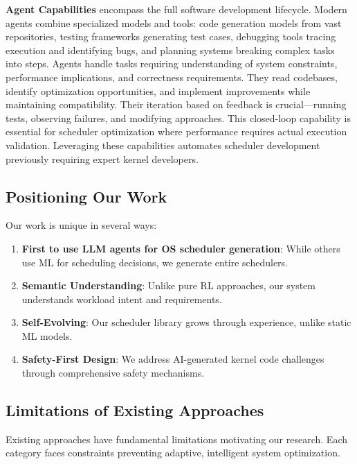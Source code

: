 \textbf{Agent Capabilities} encompass the full software development lifecycle. Modern agents combine specialized models and tools: code generation models from vast repositories, testing frameworks generating test cases, debugging tools tracing execution and identifying bugs, and planning systems breaking complex tasks into steps. Agents handle tasks requiring understanding of system constraints, performance implications, and correctness requirements. They read codebases, identify optimization opportunities, and implement improvements while maintaining compatibility. Their iteration based on feedback is crucial—running tests, observing failures, and modifying approaches. This closed-loop capability is essential for scheduler optimization where performance requires actual execution validation. Leveraging these capabilities automates scheduler development previously requiring expert kernel developers.

\subsection{Positioning Our Work}

Our work is unique in several ways:

\begin{enumerate}
\item \textbf{First to use LLM agents for OS scheduler generation}: While others use ML for scheduling decisions, we generate entire schedulers.

\item \textbf{Semantic Understanding}: Unlike pure RL approaches, our system understands workload intent and requirements.

\item \textbf{Self-Evolving}: Our scheduler library grows through experience, unlike static ML models.

\item \textbf{Safety-First Design}: We address AI-generated kernel code challenges through comprehensive safety mechanisms.
\end{enumerate}

\subsection{Limitations of Existing Approaches}

Existing approaches have fundamental limitations motivating our research. Each category faces constraints preventing adaptive, intelligent system optimization.

